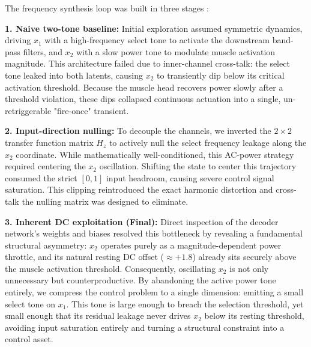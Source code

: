 \documentclass[11pt]{article}
\begin{document}
The frequency synthesis loop was built in three stages : 


\textbf{1. Naive two-tone baseline:} Initial exploration assumed symmetric dynamics, driving $x_1$ with 
a high-frequency select tone to activate the downstream band-pass filters, and $x_2$ with a slow power 
tone to modulate muscle activation magnitude. This architecture failed due to inner-channel cross-talk: 
the select tone leaked into both latents, causing $x_2$ to transiently dip below its critical activation 
threshold. Because the muscle head recovers power slowly after a threshold violation, these dips collapsed 
continuous actuation into a single, un-retriggerable "fire-once" transient.


\textbf{2. Input-direction nulling:} To decouple the channels, we inverted the $2 \times 2$ transfer function 
matrix $H_z$ to actively null the select frequency leakage along the $x_2$ coordinate. While mathematically 
well-conditioned, this AC-power strategy required centering the $x_2$ oscillation. Shifting the state to 
center this trajectory consumed the strict $[0,1]$ input headroom, causing severe control signal saturation. 
This clipping reintroduced the exact harmonic distortion and cross-talk the nulling matrix was designed to eliminate.

\textbf{3. Inherent DC exploitation (Final):} Direct inspection of the decoder network's weights and biases resolved 
this bottleneck by revealing a fundamental structural asymmetry: $x_2$ operates 
purely as a magnitude-dependent power throttle, and its natural resting DC offset ($\approx +1.8$) already sits 
securely above the muscle activation threshold. Consequently, oscillating $x_2$ is not only unnecessary but 
counterproductive. By abandoning the active power tone entirely, we compress the control problem to a single 
dimension: emitting a small select tone on $x_1$. This tone is large enough to breach the selection threshold, 
yet small enough that its residual leakage never drives $x_2$ below its resting threshold, avoiding input 
saturation entirely and turning a structural constraint into a control asset.
\end{document}
